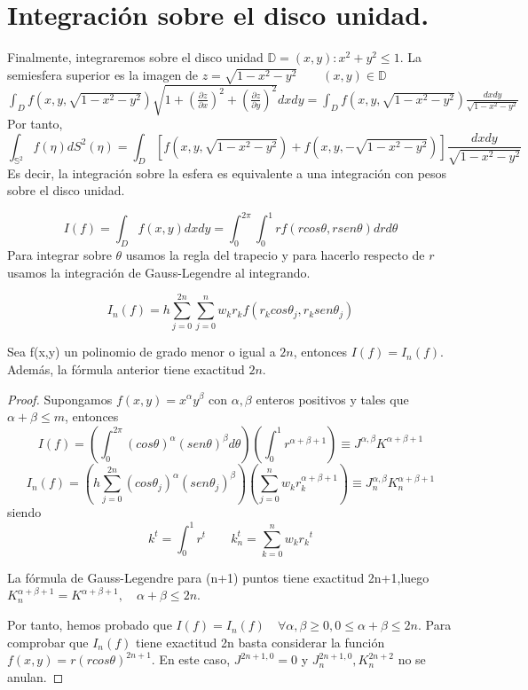 \section{Integración sobre el disco unidad.}
Finalmente, integraremos sobre el disco unidad $\mathds{D}={(x,y):x^2+y^2 \le 1}.$
La semiesfera superior es la imagen de 
$z=\sqrt{1-x^2-y^2} \qquad (x,y)\in \mathds{D}$
$\int_{D}f(x,y,\sqrt{1-x^2-y^2})\sqrt{1+(\frac{\partial z}{\partial x})^2+(\frac{\partial z}{\partial y})^2} dx dy = \int_D f(x,y,\sqrt{1-x^2-y^2})\frac{dx dy}{\sqrt{1-x^2-y^2}}$
Por tanto,
$$ \int_{\mathds{S}^2}f(\eta) dS^2(\eta) = \int_D \left[f(x,y,\sqrt{1-x^2-y^2})+f(x,y,-\sqrt{1-x^2-y^2})\right]\frac{dx dy}{\sqrt{1-x^2-y^2}} $$
Es decir, la integración sobre la esfera es equivalente a una integración con pesos sobre el disco unidad.


$$I(f)=\int_{D} f(x,y) dxdy = \int_{0}^{2\pi}\int_{0}^{1} rf(rcos\theta,rsen\theta)drd\theta $$
Para integrar sobre $\theta$ usamos la regla del trapecio y para hacerlo respecto de $r$ usamos la integración de Gauss-Legendre al integrando.

$$ I_n(f) = h\sum_{j=0}^{2n}\sum_{j=0}^{n} w_k r_k f(r_k cos\theta_j,r_ksen\theta_j)$$
\begin{thm}Sea f(x,y) un polinomio de grado menor o igual a $2n$, entonces $I(f)=I_n(f)$. Además, la fórmula anterior tiene exactitud $2n$. 
\end{thm}
\begin{proof}
	Supongamos $f(x,y)=x^\alpha y^\beta$ con  $\alpha,\beta$ enteros positivos y tales que  $\alpha+\beta \le m$, entonces
	$$
	I(f)=\left(\int_{0}^{2\pi}(cos\theta)^{\alpha}(sen\theta)^{\beta}d\theta\right)\left(\int_{0}^{1}r^{\alpha+\beta +1}\right) \equiv J^{\alpha,\beta}K^{ \alpha+\beta+1 }
	$$
	$$
	I_n(f) = \left(h\sum_{j=0}^{2n}(cos\theta_j)^{\alpha}(sen\theta_j)^{\beta}\right) \left(\sum_{j=0}^{n}w_kr_k^{\alpha+\beta+1}\right)\equiv J_n^{\alpha,\beta}K_n^{ \alpha+\beta+1 }
	$$
	siendo
	$$
	k^t = \int_{0}^{1 } r^t \qquad k_n^t=\sum_{k=0}^{n} w_k{r_k}^t
	$$
	
	
	La fórmula de Gauss-Legendre para (n+1) puntos tiene exactitud 2n+1,luego $K_n^{ \alpha+\beta+1 }=K^{ \alpha+\beta+1 }, \quad \alpha+\beta \le 2n$.
	\medskip
	
	Por tanto, hemos probado que $I(f) = I_n(f) \quad \forall \alpha,\beta\ge 0, 0\le\alpha+\beta \le 2n $.
	Para comprobar que $I_n(f)$ tiene exactitud 2n basta considerar la función $f(x,y) = r(rcos\theta)^{2n+1}$. En este caso, $J^{2n+1,0}=0$ y $J_n^{2n+1,0},K_n^{2n+2}$ no se anulan.
\end{proof}